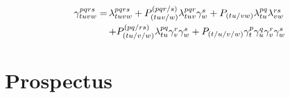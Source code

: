 \begin{equation}
    \begin{array}{r@{\,}l}
        \gamma^{pqrs}_{tuvw}
        =&
        \lambda^{pqrs}_{tuvw}
        +
        P_{(tuv/w)}^{(pqr/s)}
        \lambda^{pqr}_{tuv}
        \gamma^s_w
        +
        P_{(tu/vw)}
        \lambda^{pq}_{tu}
        \lambda^{rs}_{vw}
        \\[5pt]
        &
        +
        P_{(tu/v/w)}^{(pq/rs)}
        \lambda^{pq}_{tu}
        \gamma^r_v
        \gamma^s_w
        +
        P_{(t/u/v/w)}
        \gamma^p_t
        \gamma^q_u
        \gamma^r_v
        \gamma^s_w
    \end{array}
\end{equation}


\section{Prospectus}

